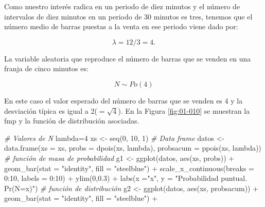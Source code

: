 \documentclass[
]{book}
\newenvironment{Shaded}{\begin{snugshade}}{\end{snugshade}}
\newcommand{\AttributeTok}[1]{\textcolor[rgb]{0.77,0.63,0.00}{#1}}
\newcommand{\CommentTok}[1]{\textcolor[rgb]{0.56,0.35,0.01}{\textit{#1}}}
\newcommand{\DecValTok}[1]{\textcolor[rgb]{0.00,0.00,0.81}{#1}}
\newcommand{\FloatTok}[1]{\textcolor[rgb]{0.00,0.00,0.81}{#1}}
\newcommand{\FunctionTok}[1]{\textcolor[rgb]{0.00,0.00,0.00}{#1}}
\newcommand{\NormalTok}[1]{#1}
\newcommand{\OtherTok}[1]{\textcolor[rgb]{0.56,0.35,0.01}{#1}}
\newcommand{\SpecialCharTok}[1]{\textcolor[rgb]{0.00,0.00,0.00}{#1}}
\newcommand{\StringTok}[1]{\textcolor[rgb]{0.31,0.60,0.02}{#1}}
\theoremstyle{definition}
\theoremstyle{definition}
\theoremstyle{definition}
\theoremstyle{definition}
\theoremstyle{remark}
\begin{document}
Como nuestro interés radica en un periodo de diez minutos y el número de intervalos de diez minutos en un periodo de 30 minutos es tres, tenemos que el número medio de barras puestas a la venta en ese periodo viene dado por:

\[\lambda = 12/3 = 4.\]

La variable aleatoria que reproduce el número de barras que se venden en una franja de cinco minutos es:

\[N \sim Po(4)\]

En este caso el valor esperado del número de barras que se venden es 4 y la desviación típica es igual a 2(\(=\sqrt{4}\)). En la Figura \ref{fig:01-010} se muestran la fmp y la función de distribución asociadas.

\begin{Shaded}
\begin{Highlighting}[]
\CommentTok{\# Valores de N}
\NormalTok{lambda}\OtherTok{=}\DecValTok{4}
\NormalTok{xs }\OtherTok{\textless{}{-}} \FunctionTok{seq}\NormalTok{(}\DecValTok{0}\NormalTok{, }\DecValTok{10}\NormalTok{, }\DecValTok{1}\NormalTok{)}
\CommentTok{\# Data frame}
\NormalTok{datos }\OtherTok{\textless{}{-}} \FunctionTok{data.frame}\NormalTok{(}\AttributeTok{xs =}\NormalTok{ xs, }\AttributeTok{probs =} \FunctionTok{dpois}\NormalTok{(xs, lambda), }
                    \AttributeTok{probsacum =} \FunctionTok{ppois}\NormalTok{(xs, lambda))}
\CommentTok{\# función de masa de probabilidad}
\NormalTok{g1 }\OtherTok{\textless{}{-}} \FunctionTok{ggplot}\NormalTok{(datos, }\FunctionTok{aes}\NormalTok{(xs, probs)) }\SpecialCharTok{+} 
  \FunctionTok{geom\_bar}\NormalTok{(}\AttributeTok{stat =} \StringTok{"identity"}\NormalTok{, }\AttributeTok{fill =} \StringTok{"steelblue"}\NormalTok{) }\SpecialCharTok{+}
  \FunctionTok{scale\_x\_continuous}\NormalTok{(}\AttributeTok{breaks =} \DecValTok{0}\SpecialCharTok{:}\DecValTok{10}\NormalTok{, }\AttributeTok{labels =} \DecValTok{0}\SpecialCharTok{:}\DecValTok{10}\NormalTok{) }\SpecialCharTok{+}
  \FunctionTok{ylim}\NormalTok{(}\DecValTok{0}\NormalTok{,}\FloatTok{0.3}\NormalTok{) }\SpecialCharTok{+}
  \FunctionTok{labs}\NormalTok{(}\AttributeTok{x =}\StringTok{"x"}\NormalTok{, }\AttributeTok{y =} \StringTok{"Probabilidad puntual. Pr(N=x)"}\NormalTok{)}
\CommentTok{\# función de distribución}
\NormalTok{g2 }\OtherTok{\textless{}{-}} \FunctionTok{ggplot}\NormalTok{(datos, }\FunctionTok{aes}\NormalTok{(xs, probsacum)) }\SpecialCharTok{+} 
  \FunctionTok{geom\_bar}\NormalTok{(}\AttributeTok{stat =} \StringTok{"identity"}\NormalTok{, }\AttributeTok{fill =} \StringTok{"steelblue"}\NormalTok{) }\SpecialCharTok{+}

\end{Highlighting}
\end{Shaded}
\end{document}

